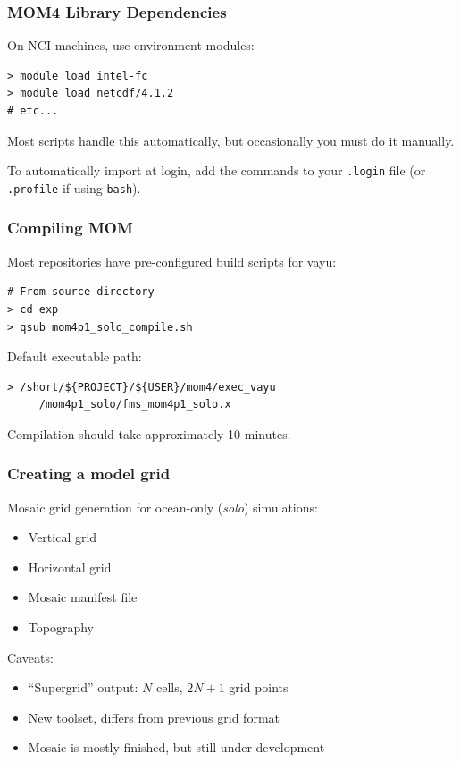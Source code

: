 \documentclass{beamer}
\begin{document}
\begin{frame}[fragile]
    \frametitle{MOM4 Library Dependencies}
    
    On NCI machines, use environment modules:
    \begin{lstlisting}
> module load intel-fc
> module load netcdf/4.1.2
# etc...
    \end{lstlisting}
    Most scripts handle this automatically, but occasionally you must do it
    manually. 

    \vspace{10pt}

    To automatically import at login, add the commands to your
    \lstinline|.login| file (or \lstinline|.profile| if using
    \lstinline|bash|).
\end{frame}

\begin{frame}[fragile]
    \frametitle{Compiling MOM}
    
    Most repositories have pre-configured build scripts for vayu:
    \begin{lstlisting}
# From source directory
> cd exp
> qsub mom4p1_solo_compile.sh
    \end{lstlisting}
    
    Default executable path:
    \begin{lstlisting}
> /short/${PROJECT}/${USER}/mom4/exec_vayu
     /mom4p1_solo/fms_mom4p1_solo.x
    \end{lstlisting}
    
    Compilation should take approximately 10 minutes. 
\end{frame}

\begin{frame}
    \frametitle{Creating a model grid}
    
    Mosaic grid generation for ocean-only (\textit{solo}) simulations:
    \begin{itemize}
        \item Vertical grid
        \item Horizontal grid
        \item Mosaic manifest file
        \item Topography
    \end{itemize}
    
    Caveats:
    \begin{itemize}
        \item ``Supergrid'' output: $N$ cells, $2N+1$ grid points
        \item New toolset, differs from previous grid format
        \item Mosaic is mostly finished, but still under development
    \end{itemize}
\end{frame}
\end{document}
